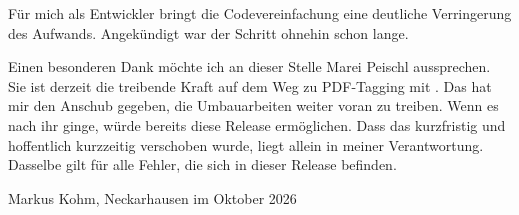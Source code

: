 Für mich als Entwickler bringt die Codevereinfachung eine deutliche
Verringerung des Aufwands. Angekündigt war der Schritt ohnehin schon lange.

Einen besonderen Dank möchte ich an dieser Stelle Marei Peischl
aussprechen. Sie ist derzeit die treibende Kraft auf dem Weg zu PDF-Tagging
mit \KOMAScript. Das hat mir den Anschub gegeben, die Umbauarbeiten weiter
voran zu treiben. Wenn es nach ihr ginge, würde bereits diese Release
 ermöglichen.  Dass das kurzfristig und hoffentlich
kurzzeitig verschoben wurde, liegt allein in meiner Verantwortung. Dasselbe
gilt für alle Fehler, die sich in dieser Release befinden.

\bigskip\noindent
Markus Kohm, Neckarhausen im Oktober 2026
\endinput


